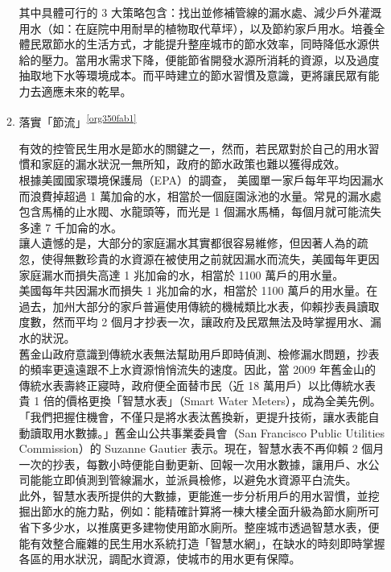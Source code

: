 \documentclass[a4paper,12pt]{article}
\begin{document}
\begin{enumerate}
\begin{enumerate}
其中具體可行的 3 大策略包含：找出並修補管線的漏水處、減少戶外灌溉用水（如：在庭院中用耐旱的植物取代草坪），以及節約家戶用水。培養全體民眾節水的生活方式，才能提升整座城市的節水效率，同時降低水源供給的壓力。當用水需求下降，便能節省開發水源所消耗的資源，以及過度抽取地下水等環境成本。而平時建立的節水習慣及意識，更將讓民眾有能力去適應未來的乾旱。\\

\item 落實「節流」\textsuperscript{\ref{org350fab1}}
\label{sec:org73ec584}

有效的控管民生用水是節水的關鍵之一，然而，若民眾對於自己的用水習慣和家庭的漏水狀況一無所知，政府的節水政策也難以獲得成效。\\

根據美國國家環境保護局（EPA）的調查， 美國單一家戶每年平均因漏水而浪費掉超過 1 萬加侖的水，相當於一個庭園泳池的水量。常見的漏水處包含馬桶的止水閥、水龍頭等，而光是 1 個漏水馬桶，每個月就可能流失多達 7 千加侖的水。\\

讓人遺憾的是，大部分的家庭漏水其實都很容易維修，但因著人為的疏忽，使得無數珍貴的水資源在被使用之前就因漏水而流失，美國每年更因家庭漏水而損失高達 1 兆加侖的水，相當於 1100 萬戶的用水量。\\

美國每年共因漏水而損失 1 兆加侖的水，相當於 1100 萬戶的用水量。在過去，加州大部分的家戶普遍使用傳統的機械類比水表，仰賴抄表員讀取度數，然而平均 2 個月才抄表一次，讓政府及民眾無法及時掌握用水、漏水的狀況。\\

舊金山政府意識到傳統水表無法幫助用戶即時偵測、檢修漏水問題，抄表的頻率更遠遠跟不上水資源悄悄流失的速度。因此，當 2009 年舊金山的傳統水表壽終正寢時，政府便全面替市民（近 18 萬用戶）以比傳統水表貴 1 倍的價格更換「智慧水表」（Smart Water Meters），成為全美先例。\\

「我們把握住機會，不僅只是將水表汰舊換新，更提升技術，讓水表能自動讀取用水數據。」舊金山公共事業委員會（San Francisco Public Utilities Commission）的 Suzanne Gautier 表示。現在，智慧水表不再仰賴 2 個月一次的抄表，每數小時便能自動更新、回報一次用水數據，讓用戶、水公司能能立即偵測到管線漏水，並派員檢修，以避免水資源平白流失。\\

此外，智慧水表所提供的大數據，更能進一步分析用戶的用水習慣，並挖掘出節水的施力點，例如：能精確計算將一棟大樓全面升級為節水廁所可省下多少水，以推廣更多建物使用節水廁所。整座城市透過智慧水表，便能有效整合龐雜的民生用水系統打造「智慧水網」，在缺水的時刻即時掌握各區的用水狀況，調配水資源，使城市的用水更有保障。\\


\end{enumerate}
\end{enumerate}
\end{document}
